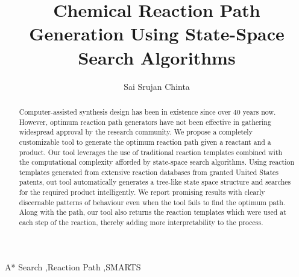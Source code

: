 \documentclass[preprint,12pt]{elsarticle}
\begin{document}
\begin{frontmatter}


\title{Chemical Reaction Path Generation Using State-Space Search Algorithms}




\author{Sai Srujan Chinta}

\address{Columbia University, New York, NY, United States}

\begin{abstract}
Computer-assisted synthesis design has been in existence since over 40 years now. However, optimum reaction path generators have not been effective in gathering widespread approval by the research community. We propose a completely customizable tool to generate the optimum reaction path given a reactant and a product. Our tool leverages the use of traditional reaction templates combined with the computational complexity afforded by state-space search algorithms. Using reaction templates generated from extensive reaction databases from granted United States patents, out tool automatically generates a tree-like state space structure and searches for the required product intelligently. We report promising results with clearly discernable patterns of behaviour even when the tool fails to find the optimum path. Along with the path, our tool also returns the reaction templates which were used at each step of the reaction, thereby adding more interpretability to the process.
\end{abstract}

\begin{keyword}
A* Search \sep Reaction Path \sep SMARTS


\end{keyword}

\end{frontmatter}
\end{document}
